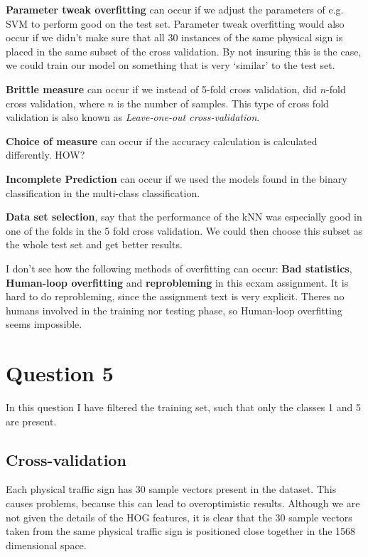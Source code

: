 \documentclass[10pt]{article}
\begin{document}
\textbf{Parameter tweak overfitting} can occur if we adjust the parameters of e.g. SVM to perform good on the test set. Parameter tweak overfitting would also occur if we didn't make sure that all 30 instances of the same physical sign is placed in the same subset of the cross validation. By not insuring this is the case, we could train our model on something that is very `similar' to the test set.

\textbf{Brittle measure} can occur if we instead of 5-fold cross validation, did $n$-fold cross validation, where $n$ is the number of samples. This type of cross fold validation is also known as \emph{Leave-one-out cross-validation}.

\textbf{Choice of measure} can occur if the accuracy calculation is calculated differently. HOW?

\textbf{Incomplete Prediction} can occur if we used the models found in the binary classification in the multi-class classification.

\textbf{Data set selection}, say that the performance of the kNN was especially good in one of the folds in the 5 fold cross validation. We could then choose this subset as the whole test set and get better results.

I don't see how the following methods of overfitting can occur: \textbf{Bad statistics}, \textbf{Human-loop overfitting} and \textbf{reprobleming} in this ecxam assignment. It is hard to do reprobleming, since the assignment text is very explicit. Theres no humans involved in the training nor testing phase, so Human-loop overfitting seems impossible. 





\section*{Question 5} %
\label{sec:question_5}
In this question I have filtered the training set, such that only the classes 1 and 5 are present.
\subsection*{Cross-validation} %
\label{sub:cross_validation}
Each physical traffic sign has 30 sample vectors present in the dataset. This causes problems, because this can lead to overoptimistic results. Although we are not given the details of the HOG features, it is clear that the 30 sample vectors taken from the same physical traffic sign is positioned close together in the 1568 dimensional space. 
\end{document}
